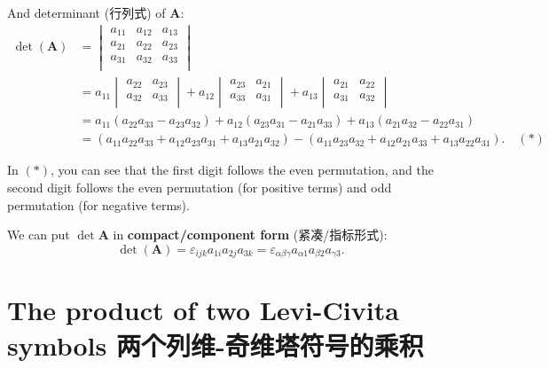 And determinant (行列式) of \(\mathbf A\): \begin{align*}
    \det (\mathbf A) & =
    \begin{vmatrix}
        a_{11} & a_{12} & a_{13} \\
        a_{21} & a_{22} & a_{23} \\
        a_{31} & a_{32} & a_{33} \\
    \end{vmatrix} \\
    & = 
    a_{11} \begin{vmatrix}
        a_{22} & a_{23} \\
        a_{32} & a_{33} \\
    \end{vmatrix} + 
    a_{12} \begin{vmatrix}
        a_{23} & a_{21} \\
        a_{33} & a_{31} \\
    \end{vmatrix} + 
    a_{13} \begin{vmatrix}
        a_{21} & a_{22} \\
        a_{31} & a_{32} \\
    \end{vmatrix} \\
    & = a_{11}(a_{22}a_{33} - a_{23}a_{32}) + a_{12}(a_{23}a_{31} - a_{21}a_{33}) + a_{13}(a_{21}a_{32} - a_{22}a_{31} ) \\
    & = (a_{11}a_{22}a_{33} + a_{12}a_{23}a_{31} + a_{13}a_{21}a_{32}) - (a_{11}a_{23}a_{32} + a_{12}a_{21}a_{33} + a_{13}a_{22}a_{31}). \quad (*)
\end{align*}

In \((*)\), you can see that the first digit follows the even
permutation, and the second digit follows the even permutation (for
positive terms) and odd permutation (for negative terms).

We can put \(\det \mathbf A\) in \textbf{compact/component form}
(紧凑/指标形式):
\[\det(\mathbf{A}) = \varepsilon_{ijk} a_{1i} a_{2j} a_{3k} = \varepsilon_{\alpha \beta \gamma} a_{\alpha 1} a_{\beta 2} a_{\gamma 3}.\]

\section{The product of two Levi-Civita symbols
两个列维-奇维塔符号的乘积}\label{the-product-of-two-levi-civita-symbols-ux4e24ux4e2aux5217ux7ef4-ux5947ux7ef4ux5854ux7b26ux53f7ux7684ux4e58ux79ef}

